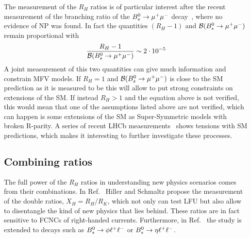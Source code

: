 The measurement of the $R_H$ ratios is of particular interest after the recent
measurement of the branching ratio of the ${{B}^0_{s}}\rightarrow{\ensuremath{\mu^+\mu^-}}$ decay~\cite{CMS:2014xfa}, 
where no evidence of NP was found. In fact the quantities $(R_H - 1)$ and
${\cal B}({{B}^0_{s}} \rightarrow {\ensuremath{\mu^+\mu^-}})$ remain proportional with
%
\begin{equation}
\frac{R_H - 1}{{\cal B}({{B}^0_{s}} \rightarrow {\ensuremath{\mu^+\mu^-}})} \sim 2 \cdot 10^{-5}
\end{equation}
%
A joint measurement of this two quantities can give much information and constrain MFV models.
If $R_H = 1$ and ${\cal B}({{B}^0_{s}} \rightarrow {\ensuremath{\mu^+\mu^-}})$ is close to the SM prediction as it is measured to be
this will allow to put strong constraints on extensions of the SM.
If instead $R_H > 1$ and the equation above is not verified, this would mean that one of the
assumptions listed above are not verified, which can happen is some extensions of the SM
as Super-Symmetric models with broken R-parity.
A series of recent LHCb measurements~\cite{TomRDreview} shows tensions with
SM predictions, which makes it interesting to further investigate these processes.

\subsection{Combining ratios}

The full power of the $R_H$ ratios in understanding new physics scenarios comes from
their combinations.  In Ref.~\cite{Hiller:2014ula} Hiller and Schmaltz propose the measurement 
of the double ratios, $X_H = R_H / R_K$, which not only can test LFU but also allow
to disentangle the kind of new physics that lies behind. These ratios are in fact sensitive
to FCNCs of right-handed currents. Furthermore, in Ref.~\cite{Hiller:2014ula} the study is extended
to \Bs decays such as ${{B}^0_{s}}\rightarrow\phi\ell^+ \ell^-$ or $\Bs\to\eta\ll$.

